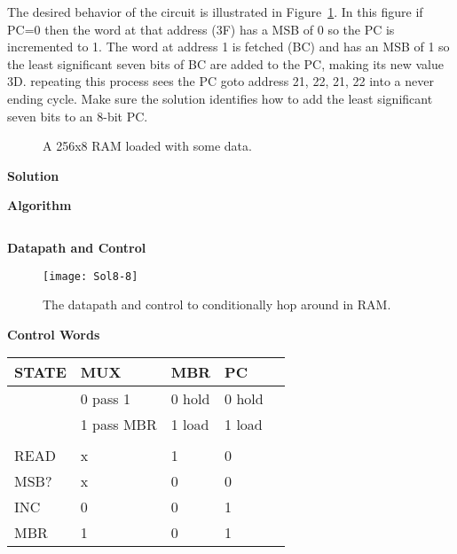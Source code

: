 \begin{enumerate}
        The desired behavior of the circuit is illustrated in
        Figure~\ref{fig:RAMhopper2}.  In this figure if PC=0 then the word at
        that address (3F) has a MSB of 0 so the PC is incremented to 1. The
        word at address 1 is fetched (BC) and has an MSB of 1 so the least
        significant seven bits of BC are added to the PC, making its new value
        3D.  repeating this process sees the PC goto address 21, 22, 21, 22
        into a never ending cycle.   Make sure the solution identifies how
        to add the least significant seven bits to an 8-bit PC.

        \begin{figure}[ht]
            \caption{A 256x8 RAM loaded with some data.}
            \label{fig:RAMhopper2}
        \end{figure}

        \begin{onlysolution}[fragile]  \textbf{Solution}\par
            \textbf{Algorithm}
              \begin{verbatim}

\end{verbatim}
            \textbf{Datapath and Control}
            \begin{figure}[ht]
                \texttt{[image: Sol8-8]}
                \caption{The datapath and control to conditionally hop around
                in RAM.}
            \end{figure}

            \textbf{Control Words}

            \begin{tabular}{l|l|l|l|l}
                STATE & MUX        & MBR    & PC     \\ \hline
                & 0 pass 1   & 0 hold & 0 hold \\ \hline
                & 1 pass MBR & 1 load & 1 load \\ \hline
                &            &        &        \\ \hline
                READ  & x          & 1      & 0      \\ \hline
                MSB?  & x          & 0      & 0      \\ \hline
                INC   & 0          & 0      & 1      \\ \hline
                MBR   & 1          & 0      & 1      \\ \hline
            \end{tabular}


\end{onlysolution}
\end{enumerate}
